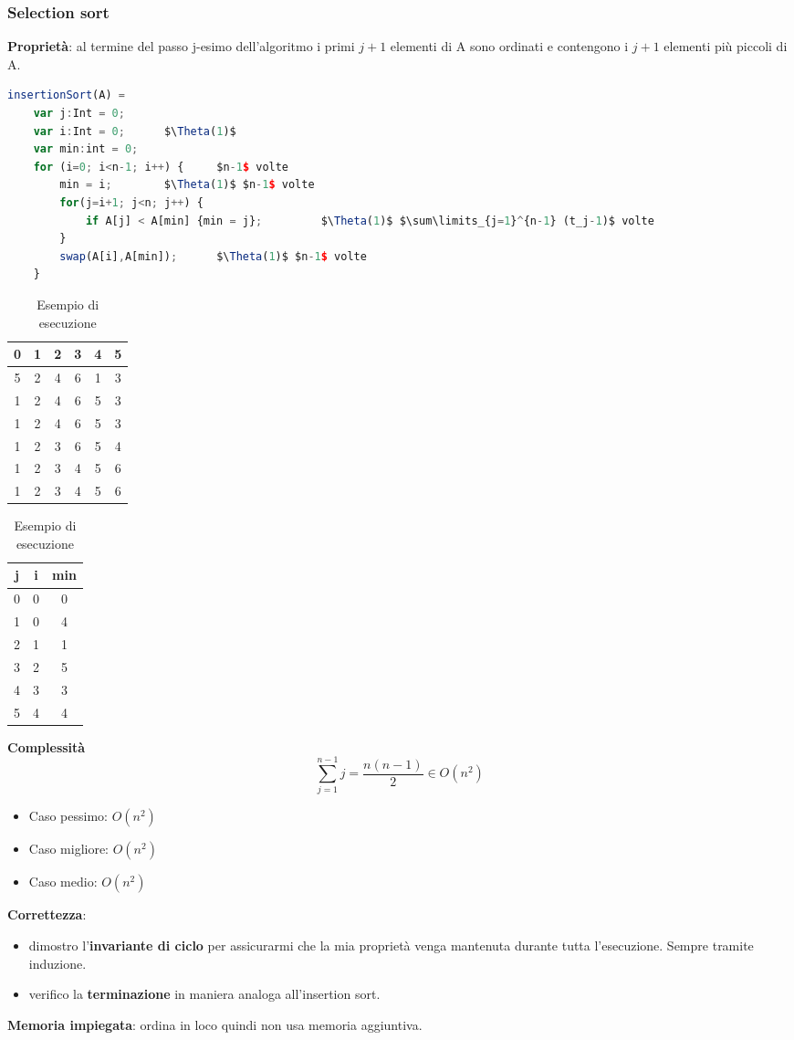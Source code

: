 \subsubsection{Selection sort}
\textbf{Proprietà}: al termine del passo j-esimo dell'algoritmo i primi $j+1$ elementi di A sono ordinati e contengono i $j+1$ elementi più piccoli di A.
\begin{lstlisting}[language=Javascript, caption=Algoritmo selection sort, mathescape=true]
	insertionSort(A) =
	var j:Int = 0;
	var i:Int = 0;		$\Theta(1)$
	var min:int = 0;
	for (i=0; i<n-1; i++) {		$n-1$ volte
		min = i;		$\Theta(1)$ $n-1$ volte
		for(j=i+1; j<n; j++) {
			if A[j] < A[min] {min = j};			$\Theta(1)$ $\sum\limits_{j=1}^{n-1} (t_j-1)$ volte
		}
		swap(A[i],A[min]);		$\Theta(1)$ $n-1$ volte
	}
\end{lstlisting}
\begin{table}[h]
	\centering
	\begin{tabular}{ |c|c|c|c|c|c| }
		\hline
		0 & 1 & 2 & 3 & 4 & 5 \\
		\hline
		5 & 2 & 4 & 6 & 1 & 3 \\
		\hline 
		1 & 2 & 4 & 6 & 5 & 3 \\
		\hline 
		1 & 2 & 4 & 6 & 5 & 3 \\
		\hline 
		1 & 2 & 3 & 6 & 5 & 4 \\
		\hline 
		1 & 2 & 3 & 4 & 5 & 6 \\
		\hline 
		1 & 2 & 3 & 4 & 5 & 6 \\
		\hline
	\end{tabular}
	\begin{tabular} { |c|c|c|}
		\hline
		j & i & min \\
		\hline
		0 & 0 & 0 \\
		\hline
		1 & 0 & 4 \\
		\hline
		2 & 1 & 1 \\
		\hline
		3 & 2 & 5 \\
		\hline
		4 & 3 & 3 \\
		\hline
		5 & 4 & 4 \\
		\hline
	\end{tabular}
	\caption{Esempio di esecuzione}
\end{table}
\textbf{Complessità}
\begin{equation}
	\sum\limits_{j=1}^{n-1} j = \frac{n(n-1)}{2} \in O(n^2)
\end{equation}
\begin{itemize}
	\item Caso pessimo: $O(n^2)$
	\item Caso migliore: $O(n^2)$
	\item Caso medio: $O(n^2)$
\end{itemize}
\textbf{Correttezza}:
\begin{itemize}
	\item dimostro l'\textbf{invariante di ciclo} per assicurarmi che la mia proprietà venga mantenuta durante tutta l'esecuzione. Sempre tramite induzione.
	\item verifico la \textbf{terminazione} in maniera analoga all'insertion sort.
\end{itemize}
\textbf{Memoria impiegata}: ordina in loco quindi non usa memoria aggiuntiva.